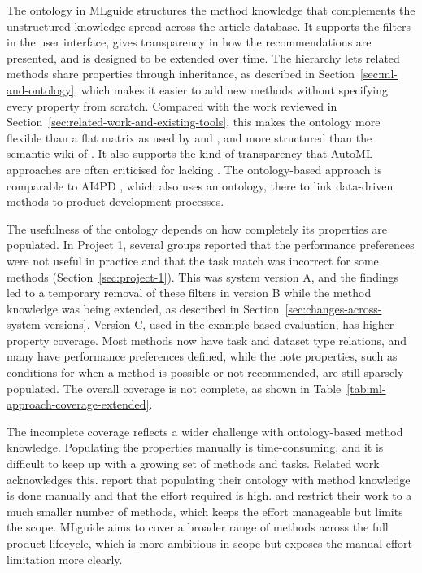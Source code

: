 The ontology in MLguide structures the method knowledge that 
complements the unstructured knowledge spread across the article 
database. It supports the filters in the user interface, gives 
transparency in how the recommendations are presented, and is 
designed to be extended over time. The hierarchy lets related 
methods share properties through inheritance, as described in 
Section~\ref{sec:ml-and-ontology}, which makes it easier to add 
new methods without specifying every property from scratch. 
Compared with the work reviewed in
Section~\ref{sec:related-work-and-existing-tools}, this makes the
ontology more flexible than a flat matrix as used by \textcite{riesener2020} and 
\textcite{lickert2021_ml_selection_reverse_logistics}, and more 
structured than the semantic wiki of 
\textcite{gerschutz2021semantic_web_approach}. It also supports 
the kind of transparency that AutoML approaches are often 
criticised for lacking 
\parencite{barbudo2023eight_years_automl_categorisation_review_trends}. 
The ontology-based approach is comparable to AI4PD 
\parencite{gerschutz2023_AI4PD}, which also uses an ontology, 
there to link data-driven methods to product development processes.

The usefulness of the ontology depends on how completely its 
properties are populated. In Project 1, several groups reported 
that the performance preferences were not useful in practice 
and that the task match was incorrect for some methods 
(Section~\ref{sec:project-1}). This was system version A, and 
the findings led to a temporary removal of these filters in 
version B while the method knowledge was being extended, as 
described in Section~\ref{sec:changes-across-system-versions}. 
Version C, used in the example-based evaluation, has higher 
property coverage. Most methods now have task and dataset type relations, 
and many have performance preferences defined, while the note properties, 
such as conditions for when a method is possible or not 
recommended, are still sparsely populated. The overall coverage 
is not complete, as shown in 
Table~\ref{tab:ml-approach-coverage-extended}.

The incomplete coverage reflects a wider challenge with 
ontology-based method knowledge. Populating the properties 
manually is time-consuming, and it is difficult to keep up with 
a growing set of methods and tasks. Related work acknowledges 
this. \textcite{gerschutz2023_AI4PD} report that populating 
their ontology with method knowledge is done manually and that 
the effort required is high. \textcite{sonntag2023pattern_ml_product_development} 
and \textcite{lickert2021_ml_selection_reverse_logistics} 
restrict their work to a much smaller number of methods, which keeps 
the effort manageable but limits the scope. MLguide aims to 
cover a broader range of methods across the full product 
lifecycle, which is more ambitious in scope but exposes the 
manual-effort limitation more clearly.

